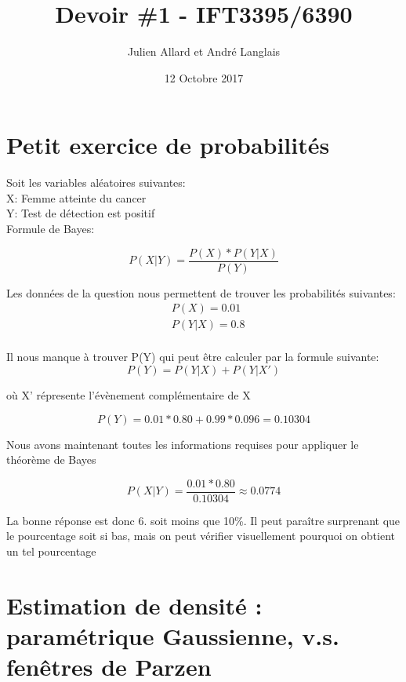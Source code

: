 \documentclass{article}
\title{Devoir \#1 - IFT3395/6390}
\author{Julien Allard et André Langlais}
\date{12 Octobre 2017}
\begin{document}
	
	\maketitle
	\newpage
	\section{Petit exercice de probabilités}
	\indent Soit les variables aléatoires suivantes: \\	
	 		X: Femme atteinte du cancer \\ 		 			
	 		Y: Test de détection est positif \\
	 		
	 Formule de Bayes:
	 	
	 \begin{equation}
		P(X|Y)= \frac{P(X)*P(Y|X)}{P(Y)}
	 \end{equation}
	 	
	 	
	 Les données de la question nous permettent de trouver les probabilités suivantes:
	 \begin{equation}
	 	\begin{split}
	 	& P(X) = 0.01 \\
	 	& P(Y|X)  = 0.8 \\
	 	\end{split}
	 \end{equation}
	 
	 Il nous manque à trouver {P(Y)} qui peut être calculer par la formule suivante:
	 \begin{equation}
	 P(Y) = P(Y|X) + P(Y|X')
	 \end{equation}
	 
	 où X' répresente l'évènement complémentaire de X
	 
	 \begin{equation}
	 P(Y)= 0.01*0.80 + 0.99*0.096 = 0.10304
	 \end{equation}
	 
	 Nous avons maintenant toutes les informations requises pour appliquer le théorème de Bayes
	 
	 	 \begin{equation}
	 	 P(X|Y)= \frac{0.01*0.80}{0.10304} \approx 0.0774
	 	 \end{equation}
	 
	 La bonne réponse est donc 6. soit moins que 10\%. 	 
	 Il peut paraître surprenant que le pourcentage soit si bas, mais on peut vérifier visuellement pourquoi on obtient un tel pourcentage
	
	
	\section{Estimation de densité : 
		\\paramétrique Gaussienne, v.s. fenêtres de Parzen}
\end{document}
